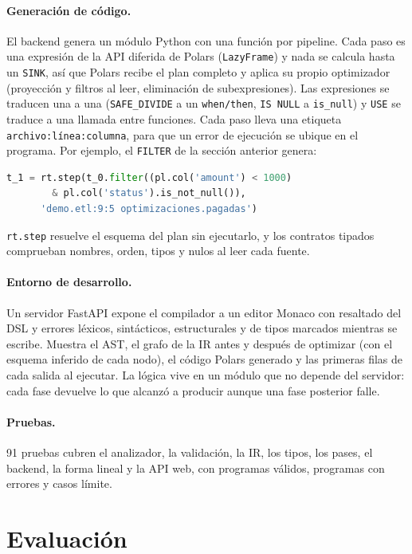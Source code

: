 \documentclass[sigplan,screen,nonacm]{acmart}
\begin{document}
\paragraph{Generación de código.}
El backend genera un módulo Python con una función por pipeline. Cada paso es una expresión
de la API diferida de Polars (\texttt{LazyFrame}) y nada se calcula hasta un \texttt{SINK},
así que Polars recibe el plan completo y aplica su propio optimizador (proyección y filtros
al leer, eliminación de subexpresiones). Las expresiones se traducen una a una
(\texttt{SAFE\_DIVIDE} a un \texttt{when/then}, \texttt{IS NULL} a \texttt{is\_null}) y
\texttt{USE} se traduce a una llamada entre funciones. Cada paso lleva una etiqueta
\texttt{archivo:línea:columna}, para que un error de ejecución se ubique en el programa. Por
ejemplo, el \texttt{FILTER} de la sección anterior genera:
\begin{lstlisting}[language=Python]
t_1 = rt.step(t_0.filter((pl.col('amount') < 1000)
        & pl.col('status').is_not_null()),
      'demo.etl:9:5 optimizaciones.pagadas')
\end{lstlisting}
\texttt{rt.step} resuelve el esquema del plan sin ejecutarlo, y los contratos tipados
comprueban nombres, orden, tipos y nulos al leer cada fuente.

\paragraph{Entorno de desarrollo.}
Un servidor FastAPI expone el compilador a un editor Monaco con resaltado del DSL y errores
léxicos, sintácticos, estructurales y de tipos marcados mientras se escribe. Muestra el AST,
el grafo de la IR antes y después de optimizar (con el esquema inferido de cada nodo), el
código Polars generado y las primeras filas de cada salida al ejecutar. La lógica vive en un
módulo que no depende del servidor: cada fase devuelve lo que alcanzó a producir aunque una
fase posterior falle.

\paragraph{Pruebas.}
91 pruebas cubren el analizador, la validación, la IR, los tipos, los pases, el backend, la
forma lineal y la API web, con programas válidos, programas con errores y casos límite.

\section{Evaluación}
\label{sec:eval}
\end{document}
